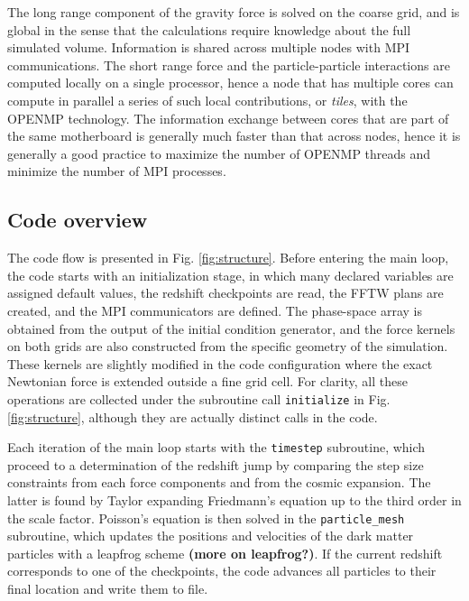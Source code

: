The long range component of the gravity force is solved on the coarse grid, 
and is global in the sense that the calculations require knowledge about the full simulated volume.
Information is shared across multiple nodes with {\small MPI} communications. 
The short range force and the particle-particle interactions  are computed locally on a single processor,  
hence a node that has multiple cores can compute in parallel a series of such local contributions, or {\it tiles}, with the {\small OPENMP} technology.
The information exchange between cores that are part of the same motherboard is generally much faster than that across nodes,
hence it is generally a good practice to maximize the number of {\small OPENMP} threads and minimize the number of {\small MPI} processes.

\subsection{Code overview}
\label{subsec:overview}

The code flow is presented in Fig. \ref{fig:structure}.
Before entering the main loop, the code starts with an initialization stage, 
in which many declared variables are assigned default values,
the redshift checkpoints are read, the {\small FFTW} plans are created, and the {\small MPI} communicators are defined.
The phase-space array  is obtained from the output of the initial condition generator,
and the force kernels on both grids are also constructed from the specific geometry of the simulation.
These kernels are slightly modified in the code configuration where the exact Newtonian force is extended outside a fine grid cell.
For clarity, all these operations are collected under the subroutine call {\tt initialize} in Fig. \ref{fig:structure}, 
although they are actually distinct calls in the code.

Each iteration of the main loop starts with the {\tt timestep} subroutine, 
which proceed to a determination of the redshift jump by comparing the step size constraints from each
force components and from the cosmic expansion.
The latter is found by Taylor expanding  Friedmann's equation up to the third order in the scale factor.
Poisson's equation is then solved  in the {\tt particle\_mesh} subroutine,
which updates the positions and velocities of the dark matter particles with a leapfrog scheme \citep{Hockney} {\bf (more on leapfrog?)}.
If the current redshift corresponds to one of the checkpoints, the code advances all particles to their final location
and write them to file.

